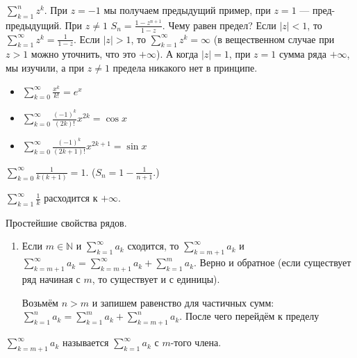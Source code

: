 \documentclass{article}
\begin{document}
\begin{itemize}
\begin{Comment}
        \end{Comment}
        \begin{Example}
            $\sum\limits_{k=1}^nz^k$. При $z=-1$ мы получаем предыдущий пример, при $z=1$ --- пред-предыдущий. При $z\neq1$ $S_n=\frac{1-z^{n+1}}{1-z}$. Чему равен предел? Если $|z|<1$, то $\sum\limits_{k=1}^\infty z^k=\frac1{1-z}$. Если $|z|>1$, то $\sum\limits_{k=1}^\infty z^k=\infty$ (в вещественном случае при $z>1$ можно уточнить, что это $+\infty$). А когда $|z|=1$, при $z=1$ сумма ряда $+\infty$, мы изучили, а при $z\neq1$ предела никакого нет в принципе.
        \end{Example}
        \begin{Example}
            \begin{itemize}
                \item $\sum\limits_{k=0}^\infty\frac{x^k}{k!}=e^x$
                \item $\sum\limits_{k=0}^\infty\frac{(-1)^k}{(2k)!}x^{2k}=\cos x$
                \item $\sum\limits_{k=0}^\infty\frac{(-1)^k}{(2k+1)!}x^{2k+1}=\sin x$
            \end{itemize}
        \end{Example}
        \begin{Example}
            $\sum\limits_{k=0}^\infty\frac1{k(k+1)}=1$. ($S_n=1-\frac1{n+1}$.)
        \end{Example}
        \begin{Example}
            $\sum\limits_{k=1}^\infty\frac1k$ расходится к $+\infty$.
        \end{Example}
        \thm Простейшие свойства рядов.
        \begin{enumerate}
            \item Если $m\in\mathbb N$ и $\sum\limits_{k=1}^\infty a_k$ сходится, то $\sum\limits_{k=m+1}^\infty a_k$ и $\sum\limits_{k=m+1}^\infty a_k=\sum\limits_{k=m+1}^\infty a_k+\sum\limits_{k=1}^m a_k$. Верно и обратное (если существует ряд начиная с $m$, то существует и с единицы).
            \begin{Proof}
                Возьмём $n>m$ и запишем равенство для частичных сумм: $\sum\limits_{k=1}^na_k=\sum\limits_{k=1}^ma_k+\sum\limits_{k=m+1}^na_k$. После чего перейдём к пределу
            \end{Proof}
        \end{enumerate}
        \dfn $\sum\limits_{k=m+1}^\infty a_k$ называется  $\sum\limits_{k=1}^\infty a_k$ с $m$-того члена.

\end{itemize}
\end{document}
